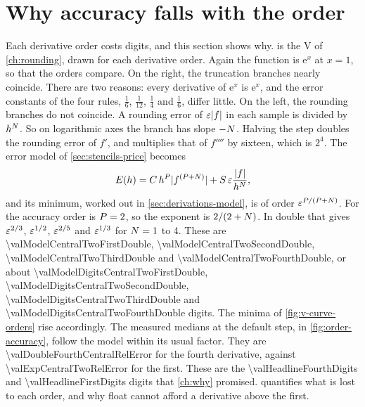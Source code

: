\section{Why accuracy falls with the order}\label{sec:orders-accuracy}

\begin{figure}
\centering

\end{figure}

Each derivative order costs digits, and this section shows why.  is the V of
\cref{ch:rounding}, drawn for each derivative order. Again the function is $\mathrm{e}^x$ at $x = 1$, so that the
orders compare. On the right, the truncation branches nearly coincide. There are two reasons: every derivative of
$\mathrm{e}^x$ is $\mathrm{e}^x$, and the error constants of the four rules, $\tfrac16$, $\tfrac1{12}$, $\tfrac14$
and $\tfrac16$, differ little. On the left, the rounding branches do not coincide. A rounding error of
$\varepsilon \lvert f \rvert$ in each sample is divided by $h^{N}$. So on logarithmic axes the branch has slope
$-N$. Halving the step doubles the rounding error of $f'$, and multiplies that of $f''''$ by sixteen, which is
$2^4$. The error model of \cref{sec:stencils-price} becomes
\begin{equation}
  E(h) = C\, h^{P} \lvert f^{(P + N)} \rvert + S\, \varepsilon \frac{\lvert f \rvert}{h^{N}},
  \label{eq:orders-model}
\end{equation}
and its minimum, worked out in \cref{sec:derivations-model}, is of order $\varepsilon^{P/(P + N)}$.
For  the accuracy order is $P = 2$, so the exponent is $2/(2 + N)$. In double that gives
$\varepsilon^{2/3}$, $\varepsilon^{1/2}$, $\varepsilon^{2/5}$ and $\varepsilon^{1/3}$ for $N = 1$ to 4. These are
\num{\valModelCentralTwoFirstDouble}, \num{\valModelCentralTwoSecondDouble}, \num{\valModelCentralTwoThirdDouble}
and \num{\valModelCentralTwoFourthDouble}, or about \num{\valModelDigitsCentralTwoFirstDouble},
\num{\valModelDigitsCentralTwoSecondDouble}, \num{\valModelDigitsCentralTwoThirdDouble} and
\num{\valModelDigitsCentralTwoFourthDouble} digits. The minima of \cref{fig:v-curve-orders} rise accordingly. The
measured medians at the default step, in \cref{fig:order-accuracy}, follow the model within its usual factor. They
are \num{\valDoubleFourthCentralRelError} for the fourth derivative, against \num{\valExpCentralTwoRelError} for the
first. These are the \num{\valHeadlineFourthDigits} and \num{\valHeadlineFirstDigits} digits that \cref{ch:why}
promised.  quantifies what is lost to each order, and why float cannot afford a
derivative above the first.

